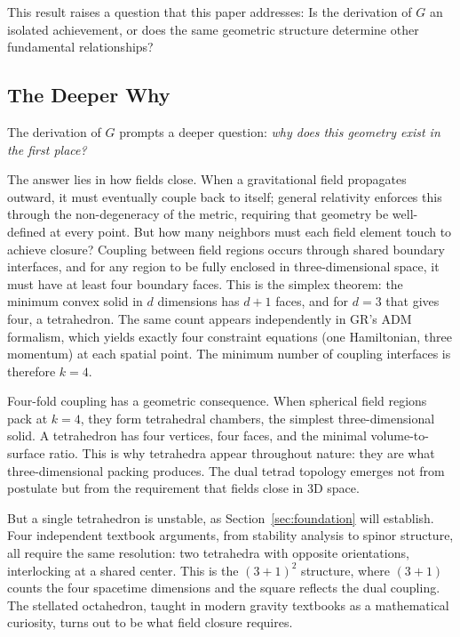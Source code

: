 \documentclass[aps,prd,preprint,superscriptaddress,showpacs,preprintnumbers,amsmath,amssymb,nofootinbib]{revtex4-2}
\begin{document}
This result raises a question that this paper addresses: Is the derivation of $G$ an isolated achievement, or does the same geometric structure determine other fundamental relationships?

\subsection{The Deeper Why}
\label{subsec:question}

The derivation of $G$ prompts a deeper question: \emph{why does this geometry exist in the first place?}

The answer lies in how fields close. When a gravitational field propagates outward, it must eventually couple back to itself; general relativity enforces this through the non-degeneracy of the metric, requiring that geometry be well-defined at every point. But how many neighbors must each field element touch to achieve closure? Coupling between field regions occurs through shared boundary interfaces, and for any region to be fully enclosed in three-dimensional space, it must have at least four boundary faces. This is the simplex theorem: the minimum convex solid in $d$ dimensions has $d + 1$ faces, and for $d = 3$ that gives four, a tetrahedron. The same count appears independently in GR's ADM formalism, which yields exactly four constraint equations (one Hamiltonian, three momentum) at each spatial point. The minimum number of coupling interfaces is therefore $k = 4$.

Four-fold coupling has a geometric consequence. When spherical field regions pack at $k = 4$, they form tetrahedral chambers, the simplest three-dimensional solid. A tetrahedron has four vertices, four faces, and the minimal volume-to-surface ratio. This is why tetrahedra appear throughout nature: they are what three-dimensional packing produces. The dual tetrad topology emerges not from postulate but from the requirement that fields close in 3D space.

But a single tetrahedron is unstable, as Section~\ref{sec:foundation} will establish. Four independent textbook arguments, from stability analysis to spinor structure, all require the same resolution: two tetrahedra with opposite orientations, interlocking at a shared center. This is the $(3+1)^2$ structure, where $(3+1)$ counts the four spacetime dimensions and the square reflects the dual coupling. The stellated octahedron, taught in modern gravity textbooks as a mathematical curiosity, turns out to be what field closure requires.
\end{document}
